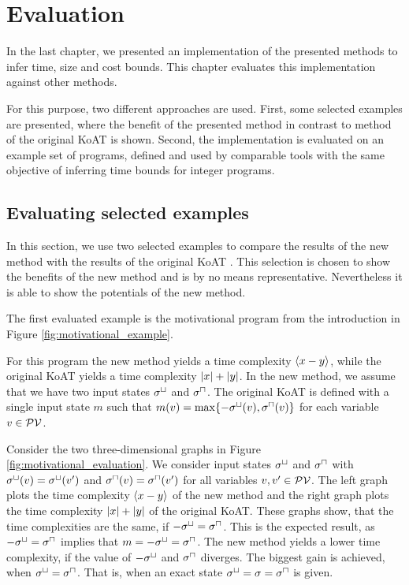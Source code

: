 \section{Evaluation}

In the last chapter, we presented an implementation of the presented methods to infer time, size and cost bounds.
This chapter evaluates this implementation against other methods.

For this purpose, two different approaches are used.
First, some selected examples are presented, where the benefit of the presented method in contrast to method of the original KoAT \cite{koat} is shown.
Second, the implementation is evaluated on an example set of programs, defined and used by comparable tools with the same objective of inferring time bounds for integer programs.

\subsection{Evaluating selected examples}

In this section, we use two selected examples to compare the results of the new method with the results of the original KoAT \cite{koat}.
This selection is chosen to show the benefits of the new method and is by no means representative.
Nevertheless it is able to show the potentials of the new method.

The first evaluated example is the motivational program from the introduction in Figure \ref{fig:motivational_example}.



For this program the new method yields a time complexity $\langle x-y\rangle$, while the original KoAT \cite{koat} yields a time complexity $\left|x\right|+\left|y\right|$.
In the new method, we assume that we have two input states ${\sigma^\sqcup}$ and ${\sigma^\sqcap}$.
The original KoAT is defined with a single input state $m$ such that $m(v) = \max \lbrace -{\sigma^\sqcup}(v),{\sigma^\sqcap}(v) \rbrace$ for each variable $v \in \mathcal{PV}$.

Consider the two three-dimensional graphs in Figure \ref{fig:motivational_evaluation}.
We consider input states ${\sigma^\sqcup}$ and ${\sigma^\sqcap}$ with ${\sigma^\sqcup}(v) = {\sigma^\sqcup}(v')$ and ${\sigma^\sqcap}(v) = {\sigma^\sqcap}(v')$ for all variables $v, v' \in \mathcal{PV}$.
The left graph plots the time complexity $\langle x-y\rangle$ of the new method and the right graph plots the time complexity $\left|x\right|+\left|y\right|$ of the original KoAT.
These graphs show, that the time complexities are the same, if $-{\sigma^\sqcup} = {\sigma^\sqcap}$.
This is the expected result, as $-{\sigma^\sqcup} = {\sigma^\sqcap}$ implies that $m = -{\sigma^\sqcup} = {\sigma^\sqcap}$.
The new method yields a lower time complexity, if the value of $-{\sigma^\sqcup}$ and ${\sigma^\sqcap}$ diverges.
The biggest gain is achieved, when ${\sigma^\sqcup} = {\sigma^\sqcap}$.
That is, when an exact state ${\sigma^\sqcup} = \sigma = {\sigma^\sqcap}$ is given.

